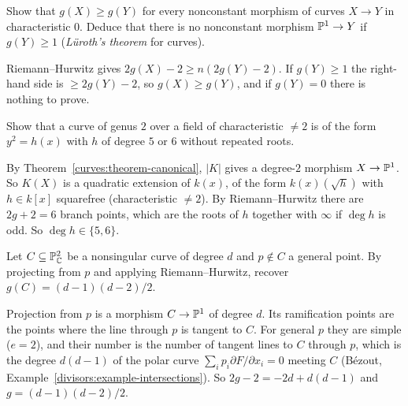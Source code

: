 \begin{exercise}\label{curves:exercise-no-rational}
Show that $g(X) \geq g(Y)$ for every nonconstant morphism of curves $X \to Y$ in characteristic $0$. Deduce that there is no nonconstant morphism $\mathbb{P}^1 \to Y$ if
$g(Y) \geq 1$ (\emph{L\"uroth's theorem} for curves).
\end{exercise}

\begin{solution}
Riemann--Hurwitz gives
$2g(X) - 2 \geq n(2g(Y) - 2)$. If $g(Y) \geq 1$ the right-hand side is $\geq 2g(Y) - 2$, so $g(X) \geq g(Y)$, and if $g(Y) = 0$ there is nothing to prove.
\end{solution}

\begin{exercise}\label{curves:exercise-genus-two}
Show that a curve of genus $2$ over a field of characteristic $\neq 2$ is of the form $y^2 = h(x)$ with $h$ of degree $5$ or $6$ without repeated roots.
\end{exercise}

\begin{solution}
By Theorem~\ref{curves:theorem-canonical}, $|K|$ gives a degree-$2$ morphism $X \to \mathbb{P}^1$. So $K(X)$ is a quadratic extension of $k(x)$, of the form $k(x)(\sqrt{h})$ with
$h \in k[x]$ squarefree (characteristic $\neq 2$). By Riemann--Hurwitz there are $2g + 2 = 6$ branch points, which are the roots of $h$ together with $\infty$ if $\deg h$ is odd.
So $\deg h \in \{5, 6\}$.
\end{solution}

\begin{exercise}\label{curves:exercise-plane-curve-genus-rh}
Let $C \subseteq \mathbb{P}^2_{\mathbb{C}}$ be a nonsingular curve of degree $d$ and $p \notin C$ a general point. By projecting from $p$ and applying Riemann--Hurwitz, recover $g(C) = (d-1)(d-2)/2$.
\end{exercise}

\begin{solution}
Projection from $p$ is a morphism $C \to \mathbb{P}^1$ of degree $d$. Its ramification points are the points where the line through $p$ is tangent to $C$. For general $p$ they are simple
($e = 2$), and their number is the number of tangent lines to $C$ through $p$, which is the degree $d(d - 1)$ of the polar curve $\sum_ip_i\partial F/\partial x_i = 0$ meeting $C$
(B\'ezout, Example~\ref{divisors:example-intersections}). So $2g - 2 = -2d + d(d - 1)$ and $g = (d-1)(d-2)/2$.
\end{solution}
